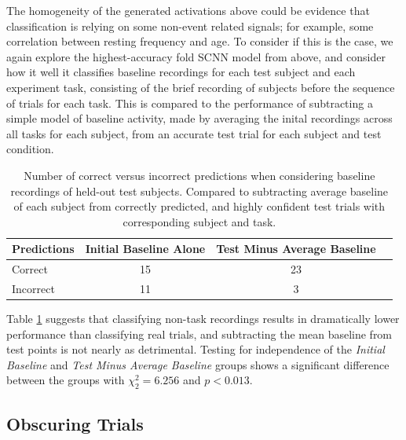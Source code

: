 \documentclass[fleqn,10pt]{wlscirep}
\begin{document}
The homogeneity of the generated activations above could be evidence that classification is relying on some non-event related signals; for example, some correlation between resting frequency and age. To consider if this is the case, we again explore the highest-accuracy fold SCNN model from above, and consider how it well it classifies baseline recordings for each test subject and each experiment task, consisting of the brief recording of subjects before the sequence of trials for each task. This is compared to the performance of subtracting a simple model of baseline activity, made by averaging the inital recordings across all tasks for each subject, from an accurate test trial for each subject and test condition.

\begin{table}[h]
 \caption{Number of correct versus incorrect predictions when considering baseline recordings of held-out test subjects. Compared to subtracting average baseline of each subject from correctly predicted, and highly confident test trials with corresponding subject and task.}
 \centering
 \begin{tabular}{l | c | c | c}
   \toprule
   \textbf{Predictions} &  \textbf{Initial Baseline Alone} & \textbf{Test Minus Average Baseline} \\
   \toprule
                        Correct           & 15 & 23  \\
                        Incorrect         & 11 &  3  \\ 
   \bottomrule
 \end{tabular}
 \label{tab:rest_performance3}
\end{table}

Table \ref{tab:rest_performance3} suggests that classifying non-task recordings results in dramatically lower performance than classifying real trials, and subtracting the mean baseline from test points is not nearly as detrimental. Testing for independence of the {\em Initial Baseline} and {\em Test Minus Average Baseline} groups shows a significant difference between the groups with $\chi^2_{2}=6.256$ and $p<0.013$.

\subsection*{Obscuring Trials}
\end{document}
